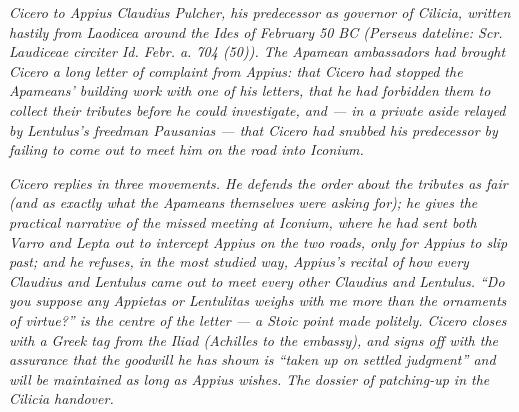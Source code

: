 
\textit{Cicero to Appius Claudius Pulcher, his
predecessor as governor of Cilicia, written hastily
from Laodicea around the Ides of February 50 BC
(Perseus dateline: \textit{Scr. Laudiceae circiter Id.
Febr. a. 704 (50)}). The Apamean ambassadors had
brought Cicero a long letter of complaint from Appius:
that Cicero had stopped the Apameans' building work
with one of his letters, that he had forbidden them to
collect their tributes before he could investigate, and
--- in a private aside relayed by Lentulus's freedman
Pausanias --- that Cicero had snubbed his predecessor
by failing to come out to meet him on the road into
Iconium.}

\textit{Cicero replies in three movements. He defends
the order about the tributes as fair (and as exactly
what the Apameans themselves were asking for); he gives
the practical narrative of the missed meeting at
Iconium, where he had sent both Varro and Lepta out to
intercept Appius on the two roads, only for Appius to
slip past; and he refuses, in the most studied way,
Appius's recital of how every Claudius and Lentulus
came out to meet every other Claudius and Lentulus.
``Do you suppose any \textit{Appietas} or \textit{Lentulitas}
weighs with me more than the ornaments of virtue?'' is
the centre of the letter --- a Stoic point made
politely. Cicero closes with a Greek tag from the
\textit{Iliad} (Achilles to the embassy), and signs off
with the assurance that the goodwill he has shown is
``taken up on settled judgment'' and will be maintained
as long as Appius wishes. The dossier of patching-up
in the Cilicia handover.}
